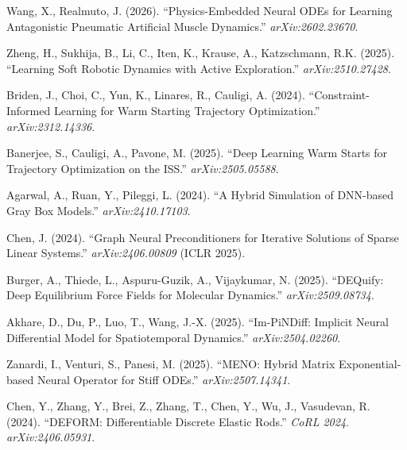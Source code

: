 \documentclass[11pt]{article}
\begin{document}
\begin{enumerate}[label={[\arabic*]}, leftmargin=2em, nosep, itemsep=0.3em]
  \item \label{ref:wang} Wang, X., Realmuto, J. (2026). ``Physics-Embedded Neural ODEs for Learning Antagonistic Pneumatic Artificial Muscle Dynamics.'' \textit{arXiv:2602.23670}. \label{cite:wang}

  \item \label{ref:zheng} Zheng, H., Sukhija, B., Li, C., Iten, K., Krause, A., Katzschmann, R.K. (2025). ``Learning Soft Robotic Dynamics with Active Exploration.'' \textit{arXiv:2510.27428}. \label{cite:softae}

  \item \label{ref:briden} Briden, J., Choi, C., Yun, K., Linares, R., Cauligi, A. (2024). ``Constraint-Informed Learning for Warm Starting Trajectory Optimization.'' \textit{arXiv:2312.14336}. \label{cite:toast}

  \item \label{ref:banerjee} Banerjee, S., Cauligi, A., Pavone, M. (2025). ``Deep Learning Warm Starts for Trajectory Optimization on the ISS.'' \textit{arXiv:2505.05588}. \label{cite:iss}

  \item \label{ref:agarwal} Agarwal, A., Ruan, Y., Pileggi, L. (2024). ``A Hybrid Simulation of DNN-based Gray Box Models.'' \textit{arXiv:2410.17103}. \label{cite:graybox}

  \item \label{ref:gnnprecond} Chen, J. (2024). ``Graph Neural Preconditioners for Iterative Solutions of Sparse Linear Systems.'' \textit{arXiv:2406.00809} (ICLR 2025). \label{cite:gnnprecond}

  \item \label{ref:dequify} Burger, A., Thiede, L., Aspuru-Guzik, A., Vijaykumar, N. (2025). ``DEQuify: Deep Equilibrium Force Fields for Molecular Dynamics.'' \textit{arXiv:2509.08734}. \label{cite:deq}

  \item \label{ref:impindiff} Akhare, D., Du, P., Luo, T., Wang, J.-X. (2025). ``Im-PiNDiff: Implicit Neural Differential Model for Spatiotemporal Dynamics.'' \textit{arXiv:2504.02260}. \label{cite:impindiff}

  \item \label{ref:meno} Zanardi, I., Venturi, S., Panesi, M. (2025). ``MENO: Hybrid Matrix Exponential-based Neural Operator for Stiff ODEs.'' \textit{arXiv:2507.14341}. \label{cite:meno}

  \item \label{ref:deform} Chen, Y., Zhang, Y., Brei, Z., Zhang, T., Chen, Y., Wu, J., Vasudevan, R. (2024). ``DEFORM: Differentiable Discrete Elastic Rods.'' \textit{CoRL 2024}. \textit{arXiv:2406.05931}. \label{cite:deform}


\end{enumerate}
\end{document}
